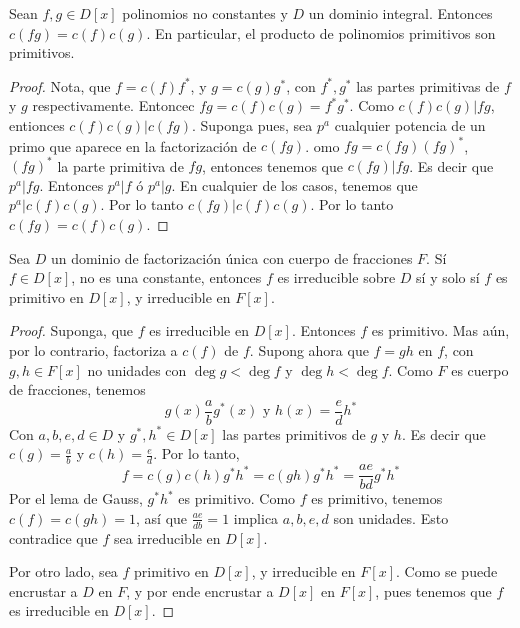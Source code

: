 \begin{lemma}\label{18.75}
    Sean $f,g \in D[x]$ polinomios no constantes y $D$ un dominio integral.
    Entonces $c(fg)=c(f)c(g)$. En particular, el producto de polinomios
    primitivos son primitivos.
\end{lemma}
\begin{proof}
    Nota, que $f=c(f)f^*$, y $g=c(g)g^*$, con $f^*,g^*$ las partes primitivas de
     $f$ y  $g$ respectivamente. Entoncec $fg=c(f)c(g)=f^*g^*$. Como
     $c(f)c(g)|fg$, entionces $c(f)c(g)|c(fg)$. Suponga pues, sea $p^a$
     cualquier potencia de un primo que aparece en la factorizaci\'on de
     $c(fg)$. omo $fg=c(fg)(fg)^*$, $(fg)^*$ la parte primitiva de $fg$,
     entonces tenemos que  $c(fg)|fg$. Es decir que $p^a|fg$. Entonces $p^a|f$
     \'o $p^a|g$. En cualquier de los casos, tenemos que $p^a|c(f)c(g)$. Por lo
     tanto $c(fg)|c(f)c(g)$. Por lo tanto $c(fg)=c(f)c(g)$.
\end{proof}

\begin{theorem}\label{18.76}
    Sea $D$ un dominio de factorizaci\'on \'unica con cuerpo de fracciones $F$.
    S\'i $f \in D[x]$, no es una constante, entonces $f$ es irreducible sobre
    $D$ s\'i y solo s\'i $f$ es primitivo en $D[x]$, y irreducible en $F[x]$.
\end{theorem}
\begin{proof}
    Suponga, que $f$ es irreducible en $D[x]$.  Entonces $f$ es primitivo. Mas
    a\'un, por lo contrario, factoriza a  $c(f)$ de $f$. Supong ahora que
    $f=gh$ en  $f$, con $g,h \in F[x]$ no unidades con $\deg{g}<\deg{f}$ y
    $\deg{h}<\deg{f}$. Como $F$ es cuerpo de fracciones, tenemos
    \begin{equation*}
        g(x)\frac{a}{b}g^*(x) \text{ y } h(x)=\frac{e}{d}h^*
    \end{equation*}
    Con $a,b,e,d \in D$ y  $g^*,h^* \in D[x]$ las partes primitivos de $g$ y
    $h$. Es decir que  $c(g)=\frac{a}{b}$ y $c(h)=\frac{e}{d}$. Por lo tanto,
    \begin{equation*}
        f=c(g)c(h)g^*h^*=c(gh)g^*h^*=\frac{ae}{bd}g^*h^*
    \end{equation*}
    Por el lema de Gauss,  $g^*h^*$ es primitivo. Como $f$ es primitivo, tenemos
    $c(f)=c(gh)=1$, as\'i que $\frac{ae}{db}=1$ implica $a,b,e,d$ son unidades.
    Esto contradice que  $f$ sea irreducible en $D[x]$.

    Por otro lado, sea $f$ primitivo en $D[x]$, y irreducible en  $F[x]$. Como
    se puede encrustar a $D$ en  $F$, y por ende encrustar a  $D[x]$ en $F[x]$,
    pues tenemos que $f$ es irreducible en  $D[x]$.
\end{proof}

